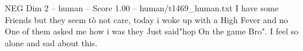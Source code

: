 \begin{textsample}{NEG Dim 2 – human – Score 1.00 – human/t1469\_human.txt}  \label{ex:f2_neg_028}
I have some Friends but they seem tò not care, today i woke up with a High Fever and no One of them asked me how i was they Just said"hop On the game Bro".
I feel so alone and sad about this.

\end{textsample}
